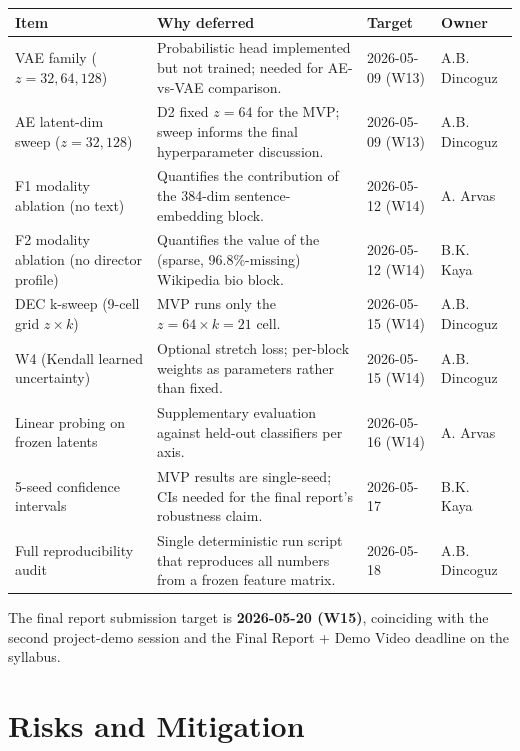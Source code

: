 \documentclass[11pt,a4paper]{article}
\begin{document}
\begin{center}\small
{}
\begin{tabular}{@{}l p{6.0cm} l l@{}}
\toprule
\textbf{Item} & \textbf{Why deferred} & \textbf{Target} & \textbf{Owner} \\
\midrule
VAE family ($z = 32, 64, 128$)        & Probabilistic head implemented but not trained; needed for AE-vs-VAE comparison. & 2026-05-09 (W13) & A.B. Dincoguz \\
AE latent-dim sweep ($z = 32, 128$)   & D2 fixed $z=64$ for the MVP; sweep informs the final hyperparameter discussion.   & 2026-05-09 (W13) & A.B. Dincoguz \\
F1 modality ablation (no text)        & Quantifies the contribution of the 384-dim sentence-embedding block.            & 2026-05-12 (W14) & A. Arvas \\
F2 modality ablation (no director profile) & Quantifies the value of the (sparse, 96.8\%-missing) Wikipedia bio block.    & 2026-05-12 (W14) & B.K. Kaya \\
DEC k-sweep (9-cell grid $z \times k$) & MVP runs only the $z{=}64{\times}k{=}21$ cell.                                   & 2026-05-15 (W14) & A.B. Dincoguz \\
W4 (Kendall learned uncertainty)      & Optional stretch loss; per-block weights as parameters rather than fixed.        & 2026-05-15 (W14) & A.B. Dincoguz \\
Linear probing on frozen latents      & Supplementary evaluation against held-out classifiers per axis.                  & 2026-05-16 (W14) & A. Arvas \\
5-seed confidence intervals           & MVP results are single-seed; CIs needed for the final report's robustness claim. & 2026-05-17       & B.K. Kaya \\
Full reproducibility audit            & Single deterministic run script that reproduces all numbers from a frozen feature matrix. & 2026-05-18       & A.B. Dincoguz \\
\bottomrule
\end{tabular}
\end{center}

\noindent The final report submission target is \textbf{2026-05-20 (W15)}, coinciding with the second project-demo session and the Final Report + Demo Video deadline on the syllabus.

\clearpage

\section{Risks and Mitigation}
\label{sec:risks}
\end{document}
